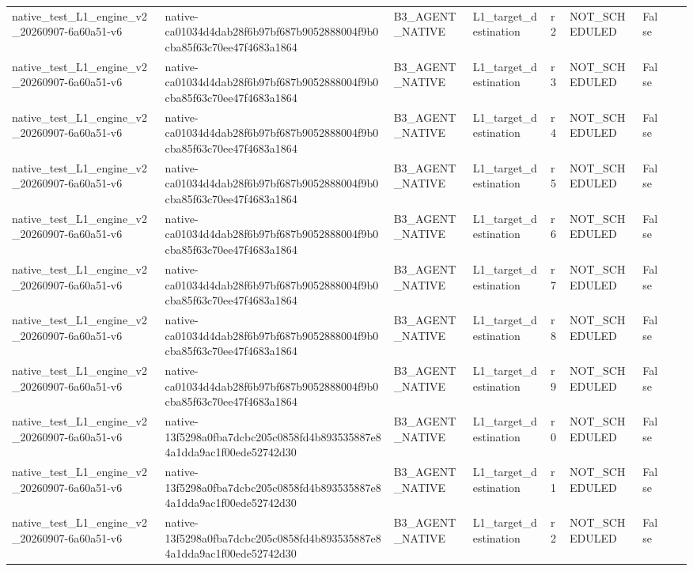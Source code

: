 \begin{tabular}{lllllllll}
native\_test\_L1\_engine\_v2\_20260907-6a60a51-v6 & native-ca01034d4dab28f6b97bf687b9052888004f9b0cba85f63c70ee47f4683a1864 & B3\_AGENT\_NATIVE & L1\_target\_destination & r2 & NOT\_SCHEDULED & False &  &  \\
native\_test\_L1\_engine\_v2\_20260907-6a60a51-v6 & native-ca01034d4dab28f6b97bf687b9052888004f9b0cba85f63c70ee47f4683a1864 & B3\_AGENT\_NATIVE & L1\_target\_destination & r3 & NOT\_SCHEDULED & False &  &  \\
native\_test\_L1\_engine\_v2\_20260907-6a60a51-v6 & native-ca01034d4dab28f6b97bf687b9052888004f9b0cba85f63c70ee47f4683a1864 & B3\_AGENT\_NATIVE & L1\_target\_destination & r4 & NOT\_SCHEDULED & False &  &  \\
native\_test\_L1\_engine\_v2\_20260907-6a60a51-v6 & native-ca01034d4dab28f6b97bf687b9052888004f9b0cba85f63c70ee47f4683a1864 & B3\_AGENT\_NATIVE & L1\_target\_destination & r5 & NOT\_SCHEDULED & False &  &  \\
native\_test\_L1\_engine\_v2\_20260907-6a60a51-v6 & native-ca01034d4dab28f6b97bf687b9052888004f9b0cba85f63c70ee47f4683a1864 & B3\_AGENT\_NATIVE & L1\_target\_destination & r6 & NOT\_SCHEDULED & False &  &  \\
native\_test\_L1\_engine\_v2\_20260907-6a60a51-v6 & native-ca01034d4dab28f6b97bf687b9052888004f9b0cba85f63c70ee47f4683a1864 & B3\_AGENT\_NATIVE & L1\_target\_destination & r7 & NOT\_SCHEDULED & False &  &  \\
native\_test\_L1\_engine\_v2\_20260907-6a60a51-v6 & native-ca01034d4dab28f6b97bf687b9052888004f9b0cba85f63c70ee47f4683a1864 & B3\_AGENT\_NATIVE & L1\_target\_destination & r8 & NOT\_SCHEDULED & False &  &  \\
native\_test\_L1\_engine\_v2\_20260907-6a60a51-v6 & native-ca01034d4dab28f6b97bf687b9052888004f9b0cba85f63c70ee47f4683a1864 & B3\_AGENT\_NATIVE & L1\_target\_destination & r9 & NOT\_SCHEDULED & False &  &  \\
native\_test\_L1\_engine\_v2\_20260907-6a60a51-v6 & native-13f5298a0fba7dcbc205c0858fd4b893535887e84a1dda9ac1f00ede52742d30 & B3\_AGENT\_NATIVE & L1\_target\_destination & r0 & NOT\_SCHEDULED & False &  &  \\
native\_test\_L1\_engine\_v2\_20260907-6a60a51-v6 & native-13f5298a0fba7dcbc205c0858fd4b893535887e84a1dda9ac1f00ede52742d30 & B3\_AGENT\_NATIVE & L1\_target\_destination & r1 & NOT\_SCHEDULED & False &  &  \\
native\_test\_L1\_engine\_v2\_20260907-6a60a51-v6 & native-13f5298a0fba7dcbc205c0858fd4b893535887e84a1dda9ac1f00ede52742d30 & B3\_AGENT\_NATIVE & L1\_target\_destination & r2 & NOT\_SCHEDULED & False &  &  \\

\end{tabular}
